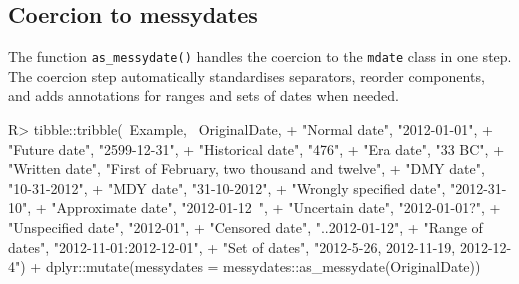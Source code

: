 \documentclass[
]{jss}
\begin{document}
\hypertarget{coercion-to-messydates}{%
\subsection{Coercion to messydates}\label{coercion-to-messydates}}

The function \texttt{as\_messydate()} handles the coercion to the
\texttt{mdate} class in one step. The coercion step automatically
standardises separators, reorder components, and adds annotations for
ranges and sets of dates when needed.

\begin{CodeChunk}
\begin{CodeInput}
R> tibble::tribble(~Example, ~OriginalDate,
+                 "Normal date", "2012-01-01",
+                 "Future date", "2599-12-31",
+                 "Historical date", "476",
+                 "Era date", "33 BC",
+                 "Written date", "First of February, two thousand and twelve",
+                 "DMY date", "10-31-2012",
+                 "MDY date", "31-10-2012",
+                 "Wrongly specified date", "2012-31-10",
+                 "Approximate date", "2012-01-12~",
+                 "Uncertain date", "2012-01-01?",
+                 "Unspecified date", "2012-01",
+                 "Censored date", "..2012-01-12",
+                 "Range of dates", "2012-11-01:2012-12-01",
+                 "Set of dates", "2012-5-26, 2012-11-19, 2012-12-4") %
+   dplyr::mutate(messydates = messydates::as_messydate(OriginalDate))
\end{CodeInput}
\begin{CodeOutput}
# A tibble: 14 x 3
   Example                OriginalDate                               messydates 
   <chr>                  <chr>                                      <mdate>    
 1 Normal date            2012-01-01                                 2012-01-01~
 2 Future date            2599-12-31                                 2599-12-31~
 3 Historical date        476                                        0476      ~
 4 Era date               33 BC                                      -0033     ~
 5 Written date           First of February, two thousand and twelve 2012-02-01~
 6 DMY date               10-31-2012                                 2012-10-31~
 7 MDY date               31-10-2012                                 2012-10-31~
 8 Wrongly specified date 2012-31-10                                 2012-10-31~
 9 Approximate date       2012-01-12~                                2012-01-12~
10 Uncertain date         2012-01-01?                                2012-01-01~
11 Unspecified date       2012-01                                    2012-01   ~
12 Censored date          ..2012-01-12                               ..2012-01-~
13 Range of dates         2012-11-01:2012-12-01                      2012-11-01~
14 Set of dates           2012-5-26, 2012-11-19, 2012-12-4           {2012-05-2~
\end{CodeOutput}
\end{CodeChunk}
\end{document}
